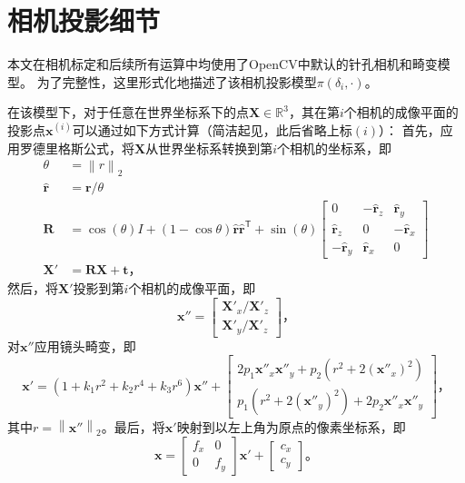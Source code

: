 \appendix

\chapter{相机投影细节}

本文在相机标定和后续所有运算中均使用了OpenCV中默认的针孔相机和畸变模型。
为了完整性，这里形式化地描述了该相机投影模型$\pi(\delta_i, \cdot)$。

在该模型下，对于任意在世界坐标系下的点$\mathbf{X}\in \mathbb{R}^3$，其在第$i$个相机的成像平面的投影点$\mathbf{x}^{(i)}$可以通过如下方式计算（简洁起见，此后省略上标$(i)$）：
首先，应用罗德里格斯公式\cite{rodrigues}，将$\mathbf{X}$从世界坐标系转换到第$i$个相机的坐标系，即
\begin{align}
    \theta &= \left\|r\right\|_2 \\
    \hat{\mathbf{r}} &= \mathbf{r}/ \theta \\
    \mathbf{R} &= \cos(\theta) I + (1- \cos{\theta} ) \hat{\mathbf{r}} \hat{\mathbf{r}}^\mathsf{T} + \sin(\theta) \begin{bmatrix}
         0   & -\hat{\mathbf{r}}_z & \hat{\mathbf{r}}_y \\
         \hat{\mathbf{r}}_z & 0    & -\hat{\mathbf{r}}_x \\
        -\hat{\mathbf{r}}_y &  \hat{\mathbf{r}}_x & 0
    \end{bmatrix}\label{eq:rodrigues} \\
    \mathbf{X}' &= \mathbf{R} \mathbf{X} + \mathbf{t}\text{，}
\end{align}
然后，将$\mathbf{X}'$投影到第$i$个相机的成像平面，即
\begin{equation}
    \mathbf{x}'' = \begin{bmatrix}
        \mathbf{X}'_x / \mathbf{X}'_z \\
        \mathbf{X}'_y / \mathbf{X}'_z
    \end{bmatrix}\text{，}
\end{equation}
对$\mathbf{x}''$应用镜头畸变，即
\begin{equation}
    \mathbf{x}' = \left(1 + k_1 r^2 + k_2 r^4 + k_3 r^6\right) \mathbf{x}'' + \begin{bmatrix}
        2 p_1 \mathbf{x}''_x \mathbf{x}''_y + p_2 \left(r^2 + 2 (\mathbf{x}''_x)^2\right) \\
        p_1 \left(r^2 + 2 (\mathbf{x}''_y)^2\right) + 2 p_2 \mathbf{x}''_x \mathbf{x}''_y
    \end{bmatrix}\text{，}
\end{equation}
其中$r = \left\|\mathbf{x}''\right\|_2$。最后，将$\mathbf{x}'$映射到以左上角为原点的像素坐标系，即
\begin{equation}
    \mathbf{x} = \begin{bmatrix}f_x & 0 \\ 0 & f_y \end{bmatrix} \mathbf{x}' + \begin{bmatrix}c_x \\ c_y \end{bmatrix}\text{。}
\end{equation}

